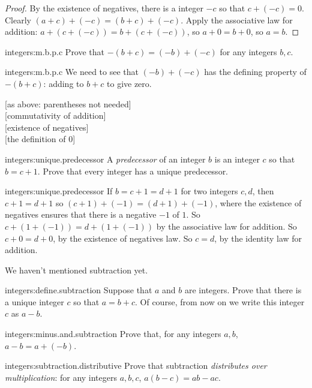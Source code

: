 \begin{proof}
By the existence of negatives, there is a integer \(-c\) so that \(c+(-c)=0\).
Clearly \((a+c)+(-c)=(b+c)+(-c)\).
Apply the associative law for addition: \(a+(c+(-c))=b+(c+(-c))\), so \(a+0=b+0\), so \(a=b\). 
\end{proof}
\begin{problem}{integers:m.b.p.c}
Prove that \(-(b+c)=(-b)+(-c)\) for any integers \(b,c\).
\end{problem}
\begin{answer}{integers:m.b.p.c}
We need to see that \((-b)+(-c)\) has the defining property of \(-(b+c)\): adding to \(b+c\) to give zero.
\begin{twocolumnproof}
[as above: parentheses not needed] \\
[commutativity of addition] \\
[existence of negatives] \\
[the definition of \(0\)]
\end{twocolumnproof}
\end{answer}
\begin{problem}{integers:unique.predecessor}
A \emph{predecessor} of an integer \(b\) is an integer \(c\) so that \(b=c+1\).
Prove that every integer has a unique predecessor.
\end{problem}
\begin{answer}{integers:unique.predecessor}
If \(b=c+1=d+1\) for two integers \(c,d\), then \(c+1=d+1\) so \((c+1)+(-1)=(d+1)+(-1)\), where the existence of negatives ensures that there is a negative \(-1\) of \(1\).
So \(c+(1+(-1))=d+(1+(-1))\) by the associative law for addition.
So \(c+0=d+0\), by the existence of negatives law.
So \(c=d\), by the identity law for addition.
\end{answer}
We haven't mentioned subtraction yet.
\begin{problem}{integers:define.subtraction}
Suppose that \(a\) and \(b\) are integers.
Prove that there is a unique integer \(c\) so that \(a=b+c\).
Of course, from now on we write this integer \(c\) as \(a-b\).
\end{problem}
\begin{problem}{integers:minus.and.subtraction}
Prove that, for any integers \(a,b\), \(a-b=a+(-b)\).
\end{problem}

\begin{problem}{integers:subtraction.distributive}
Prove that subtraction \emph{distributes over multiplication}: for any integers \(a,b,c\), \(a(b-c)=ab-ac\).
\end{problem}

